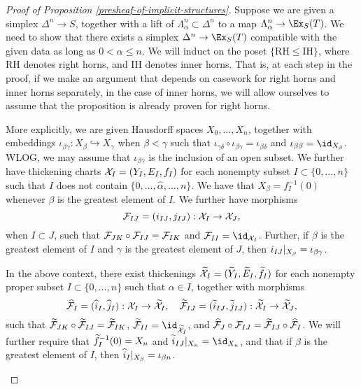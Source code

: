 \begin{proof}[Proof of Proposition \ref{presheaf-of-implicit-structures}]

Suppose we are given a simplex $\Delta^n \to S$, together with a lift of $\Lambda^n_\alpha \subset \Delta^n$ to a map $\Lambda^n_\alpha \to \Ex_S(T)$. We need to show that there exists a simplex $\Delta^n \to \Ex_S(T)$ compatible with the given data as long as $0 < \alpha \leq n$. We will induct on the poset $\{ \mathrm{RH} \leq \mathrm{IH} \}$, where $\mathrm{RH}$ denotes right horns, and $\mathrm{IH}$ denotes inner horns. That is, at each step in the proof, if we make an argument that depends on casework for right horns and inner horns separately, in the case of inner horns, we will allow ourselves to assume that the proposition is already proven for right horns.

More explicitly, we are given Hausdorff spaces $X_0, \dots, X_n$, together with embeddings $\iota_{\beta \gamma}: X_\beta \hookrightarrow X_\gamma$ when $\beta < \gamma$ such that $\iota_{\gamma \delta} \circ \iota_{\beta \gamma} = \iota_{\beta \delta}$ and $\iota_{\beta \beta} = \id_{X_\beta}$. WLOG, we may assume that $\iota_{\beta \gamma}$ is the inclusion of an open subset. We further have thickening charts $\mathcal X_I = (Y_I, E_I, f_I)$ for each nonempty subset $I \subset \{0, \dots, n\}$ such that $I$ does not contain $\{0, \dots, \widehat{\alpha}, \dots, n\}$. We have that $X_\beta = f_I^{-1}(0)$ whenever $\beta$ is the greatest element of $I$. We further have morphisms
\[ \mathcal F_{IJ} = (i_{I J}, j_{I J}): \mathcal X_I \to \mathcal X_J, \]
when $I \subset J$, such that $\mathcal F_{JK} \circ \mathcal F_{IJ} = \mathcal F_{IK}$ and $\cF_{II} = \id_{\cX_I}$. Further, if $\beta$ is the greatest element of $I$ and $\gamma$ is the greatest element of $J$, then ${i_{I J}|_{X_\beta}} = \iota_{\beta \gamma}$.

\begin{lemma}\label{existence-of-good-thickenings}
In the above context, there exist thickenings $\widetilde {\mathcal X}_I = (\widetilde Y_I, \widetilde E_I, \widetilde f_I)$ for each nonempty proper subset $I \subset \{0, \dots, n\}$ such that $\alpha \in I$, together with morphisms
\[ \widehat {\mathcal F}_I = (\widehat i_I, \widehat j_I): \mathcal X_I \to \widetilde {\mathcal X}_I, \quad \widetilde {\mathcal F}_{IJ} = (\widetilde i_{IJ}, \widetilde j_{IJ}) : \widetilde {\mathcal X}_I \to \widetilde {\mathcal X}_J, \]
such that $\widetilde {\mathcal F}_{JK} \circ \widetilde {\mathcal F}_{IJ} = \widetilde {\mathcal F}_{IK}$, $\wt \cF_{II} = \id_{\wt \cX_I}$, and $\widehat {\mathcal F}_J \circ \mathcal F_{IJ} = \widetilde {\mathcal F}_{IJ} \circ \widehat {\mathcal F}_I$. We will further require that $\widetilde f_I^{-1}(0) = X_n$ and $\rest{\wt i_{IJ}}{X_n} = \id_{X_n}$, and that if $\beta$ is the greatest element of $I$, then ${\widehat i_I|_{X_\beta}} = \iota_{\beta n}$.
\end{lemma}


\end{proof}
